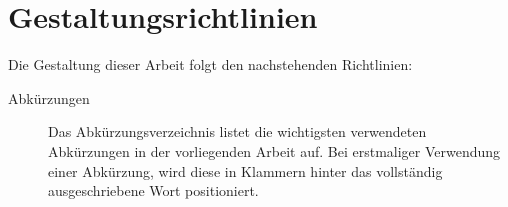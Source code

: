 \chapter*{Gestaltungsrichtlinien}

Die Gestaltung dieser Arbeit folgt den nachstehenden Richtlinien:

\bigskip

\begin{description}
	\item[Abkürzungen] Das Abkürzungsverzeichnis listet die wichtigsten verwendeten Abkürzungen in der vorliegenden Arbeit auf. Bei erstmaliger Verwendung einer Abkürzung, wird diese in Klammern hinter das vollständig ausgeschriebene Wort positioniert.
\end{description}

